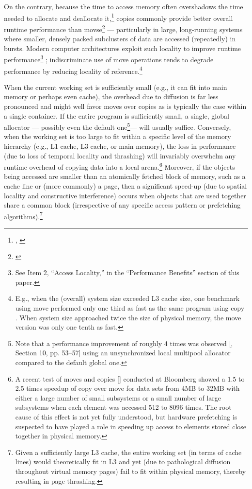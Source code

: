 On the contrary, because the time to access memory often overshadows the time
needed to allocate and deallocate it,\footnote{\cite{lakos16}, \cite{bleaney16}}
copies commonly provide better overall
runtime performance than movse\footnote{\cite{halpern20d}}
— particularly in large, long-running systems
where smaller, densely packed subclusters of data are accessed (repeatedly) in
bursts. Modern computer architectures exploit such locality to improve runtime
performance\footnote{See Item 2, “Access Locality,” in
the “Performance Benefits” section of this paper.}
; indiscriminate use of move operations tends to degrade performance
by reducing locality of reference.\footnote{E.g., when the (overall) system size exceeded L3 cache size, one benchmark using move performed
only one third as fast as the same program using copy \cite{halpern20d}. When system size approached
twice the size of physical memory, the move version was only one tenth as fast.}

When the current working set is sufficiently small (e.g., it can fit into main memory
or perhaps even cache), the overhead due to diffusion is far less pronounced and
might well favor moves over copies as is typically the case within a single container.
If the entire program is sufficiently small, a single, global allocator — possibly even
the default one\footnote{Note that a performance improvement of
roughly 4 times was observed [\cite{lakos16}, Section 10, pp.
53–57] using an unsynchronized local multipool allocator compared to the default global one.}— will usually suffice. Conversely, when the working set is too
large to fit within a specific level of the memory hierarchy (e.g., L1 cache, L3 cache,
or main memory), the loss in performance (due to loss of temporal locality and
thrashing) will invariably overwhelm any runtime overhead of copying data into a
local arena.\footnote{A recent test of moves and copies [\cite{halpern20d}] conducted at Bloomberg showed a 1.5 to 2.5 times
speedup of copy over move for data sets from 4MB to 32MB with either a large number of small
subsystems or a small number of large subsystems when each element was accessed 512 to 8096
times. The root cause of this effect is not yet fully understood, but hardware prefetching is suspected
to have played a role in speeding up access to elements stored close together in physical memory.}
 Moreover, if the objects being accessed are smaller than an atomically
fetched block of memory, such as a cache line or (more commonly) a page, then a
significant speed-up (due to spatial locality and constructive interference) occurs
when objects that are used together share a common block (irrespective of any
specific access pattern or prefetching algorithms).\footnote{Given a sufficiently large L3 cache, the entire working set (in terms of cache lines) would
theoretically fit in L3 and yet (due to pathological diffusion throughout virtual memory pages) fail to
fit within physical memory, thereby resulting in page thrashing.}


